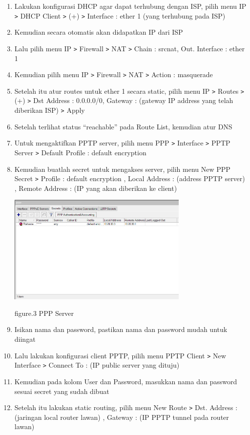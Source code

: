 \begin{enumerate}
    \item Lakukan konfigurasi DHCP agar dapat terhubung dengan ISP, pilih menu IP \texttt{\text>} DHCP Client \texttt{\text>} (+) \texttt{\text>} Interface : ether 1 (yang terhubung pada ISP)
    \item Kemudian secara otomatis akan didapatkan IP dari ISP
    \item Lalu pilih menu IP \texttt{\text>} Firewall \texttt{\text>} NAT \texttt{\text>} Chain : srcnat, Out. Interface : ether 1
    \item Kemudian pilih menu IP \texttt{\text>} Firewall \texttt{\text>} NAT \texttt{\text>} Action : masquerade
    \item Setelah itu atur routes untuk ether 1 secara static, pilih menu IP \texttt{\text>} Routes \texttt{\text>} (+) \texttt{\text>} Dst Address : 0.0.0.0/0, Gateway : (gateway IP address yang telah diberikan ISP) \texttt{\text>} Apply
    \item Setelah terlihat status “reachable” pada Route List, kemudian atur DNS
    \item Untuk mengaktifkan PPTP server, pilih menu PPP \texttt{\text>} Interface \texttt{\text>} PPTP Server \texttt{\text>} Default Profile : default encryption
    \item Kemudian buatlah secret untuk mengakses server, pilih menu New PPP Secret \texttt{\text>} Profile : default encryption , Local Address : (address PPTP server) , Remote Address : (IP yang akan diberikan ke client)
    
    \begin{center}
        \includegraphics[width=0.7\textwidth]{image/P4/ppp.png}    
        
        figure.3 PPP Server
    \end{center}

    \item Isikan nama dan password, pastikan nama dan password mudah untuk diingat
    \item Lalu lakukan konfigurasi client PPTP, pilih menu PPTP Client \texttt{\text>} New Interface \texttt{\text>} Connect To : (IP public server yang dituju)
    \item Kemudian pada kolom User dan Password, masukkan nama dan password sesuai secret yang sudah dibuat
    \item Setelah itu lakukan static routing, pilih menu New Route \texttt{\text>} Dst. Address : (jaringan local router lawan) , Gateway : (IP PPTP tunnel pada router lawan)
    

\end{enumerate}
